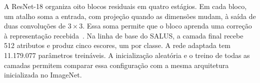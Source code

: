 A ResNet-18 organiza oito blocos residuais em quatro estágios. Em cada bloco, um atalho soma a entrada, com projeção quando as dimensões mudam, à saída de duas convoluções de $3\times3$. Essa soma permite que o bloco aprenda uma correção à representação recebida~\cite{he2016residual}. Na linha de base do SALUS, a camada final recebe 512 atributos e produz cinco escores, um por classe. A rede adaptada tem 11.179.077 parâmetros treináveis. A inicialização aleatória e o treino de todas as camadas permitem comparar essa configuração com a mesma arquitetura inicializada no ImageNet.
